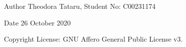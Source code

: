 \begin{DoxyAuthor}{Author}
Theodora Tataru, Student No\+: C00231174 
\end{DoxyAuthor}
\begin{DoxyDate}{Date}
26 October 2020 
\end{DoxyDate}
\begin{DoxyCopyright}{Copyright}
License\+: G\+NU Affero General Public License v3. 
\end{DoxyCopyright}
